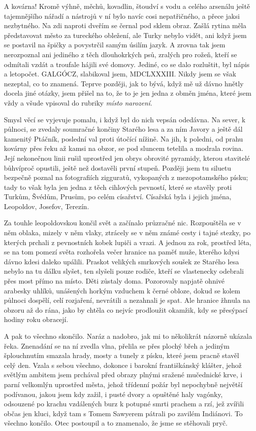 A kovárna! Kromě výhně, měchů, kovadlin, štoudví s vodu a celého arsenálu ještě tajemnějšího nářadí a nástrojů v ní bylo navíc cosi nepatřičného, a přece jaksi nezbytného. Na zdi naproti dveřím se černal pod sklem obraz. Zašlá rytina měla představovat město za tureckého obležení, ale Turky nebylo vidět, ani když jsem se postavil na špičky a povystrčil samým úsilím jazyk. A zrovna tak jsem nerozpoznal ani jediného z těch dlouhokrkých psů, zralých pro rožeň, kteří se odmítali vzdát a troufale hájili své domovy. Jediné, co se dalo rozluštit, byl nápis a letopočet. GALGÓCZ, slabikoval jsem, MDCLXXXIII. Nikdy jsem se však nezeptal, co to znamená. Teprve později, jak to bývá, když mě už dávno hnětly docela jiné otázky, jsem přišel na to, že to je jen jedna z obměn jména, které jsem vždy a všude vpisoval do rubriky \textit{místo narození}.

Smysl věcí se vyjevuje pomalu, i když byl do nich vepsán odedávna. Na sever, k půlnoci, se zvedaly soumračné končiny Starého lesa a za ním Javory a ještě dál kamenitý Ptáčník, poslední val proti útočící nížině. Na jih, k poledni, od prahu kovárny přes řeku až kamsi na obzor, se pod sluncem tetelila a modrala rovina. Její nekonečnou linii rušil uprostřed jen obrys obrovité pyramidy, kterou stavitelé bůhvíproč opustili, ještě než dostavěli první stupeň. Později jsem tu siluetu bezpečně poznal na fotografiích zigguratů, vykopaných z mezopotamského písku; tady to však byla jen jedna z těch cihlových pevností, které se stavěly proti Turkům, Švédům, Prusům, po celém císařství. Císařská byla i jejich jména, Leopoldov, Josefov, Terezín. 

Za touhle leopoldovskou končil svět a začínalo průzračné nic. Rozpouštěla se v něm oblaka, mizely v něm vlaky, ztrácely se v něm známé cesty i tajné stezky, po kterých prchali z pevnostních kobek lupiči a vrazi. A jednou za rok, prostřed léta, se na tom pomezí světa rozhořela večer hranice na paměť muže, kterého kdysi dávno kdesi daleko upálili. Praskot velikých smrkových soušek ze Starého lesa nebylo na tu dálku slyšet, ten slyšeli pouze rodiče, kteří se vlastenecky odebrali přes most přímo na místo. Děti zůstaly doma. Pozorovaly napjatě ohnivé arabesky uhlíků, unášených horkým vzduchem k černé obloze, dokud se kolem půlnoci dospělí, celí rozjaření, nevrátili a nezahnali je spat. Ale hranice žhnula na obzoru až do rána, jako by chtěla co nejvíc prodloužit okamžik, kdy se přesýpací hodiny roku obracejí. 

A pak to všechno skončilo. Naráz a nadobro, jak mi to několikrát názorně ukázala řeka. Znenadání se na ní zvedla vlna, přelila se přes plochý břeh a jediným šplouchnutím smazala hrady, mosty a tunely z písku, které jsem pracně stavěl celý den. Vzala s sebou všechno, dokonce i barokní františkánský klášter, jehož světlým ambitem jsem prchával před obrazy plnými sražené mučednické krve, i parní velkomlýn uprostřed města, jehož třídenní požár byl nepochybně největší podívanou, jakou jsem kdy zažil, i pusté dvory a opuštěné haly vagónky, odsouzené po krachu vzdálených burz k potupné smrti prachem a rzí, jež zvířili občas jen kluci, když tam s Tomem Sawyerem pátrali po zavilém Indiánovi. To všechno končilo. Otec postoupil a to znamenalo, že jsme se stěhovali pryč.

